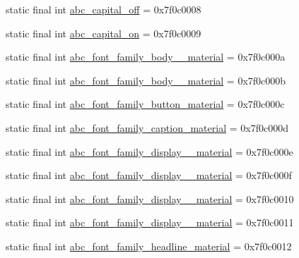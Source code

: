\begin{DoxyCompactItemize}
\item 
static final int \mbox{\hyperlink{classandroid_1_1support_1_1v7_1_1appcompat_1_1R_1_1string_aacb655193c810fc524a35c78ded4dcd3}{abc\+\_\+capital\+\_\+off}} = 0x7f0c0008
\item 
static final int \mbox{\hyperlink{classandroid_1_1support_1_1v7_1_1appcompat_1_1R_1_1string_a714a9eb16e5ecc1746afa1935c5db85e}{abc\+\_\+capital\+\_\+on}} = 0x7f0c0009
\item 
static final int \mbox{\hyperlink{classandroid_1_1support_1_1v7_1_1appcompat_1_1R_1_1string_adaa0ecc02001e33c4337d727dfdf67c4}{abc\+\_\+font\+\_\+family\+\_\+body\+\_\+\_\+material}} = 0x7f0c000a
\item 
static final int \mbox{\hyperlink{classandroid_1_1support_1_1v7_1_1appcompat_1_1R_1_1string_a6127fc35768e2627c9ba2221605f791e}{abc\+\_\+font\+\_\+family\+\_\+body\+\_\+\_\+material}} = 0x7f0c000b
\item 
static final int \mbox{\hyperlink{classandroid_1_1support_1_1v7_1_1appcompat_1_1R_1_1string_a2429f6336734f4aada6e25c554c6664e}{abc\+\_\+font\+\_\+family\+\_\+button\+\_\+material}} = 0x7f0c000c
\item 
static final int \mbox{\hyperlink{classandroid_1_1support_1_1v7_1_1appcompat_1_1R_1_1string_a0f7d1696200dbc7ff9e5252fa543fbb3}{abc\+\_\+font\+\_\+family\+\_\+caption\+\_\+material}} = 0x7f0c000d
\item 
static final int \mbox{\hyperlink{classandroid_1_1support_1_1v7_1_1appcompat_1_1R_1_1string_a177aacdc666532983bbc01a7f8586670}{abc\+\_\+font\+\_\+family\+\_\+display\+\_\+\_\+material}} = 0x7f0c000e
\item 
static final int \mbox{\hyperlink{classandroid_1_1support_1_1v7_1_1appcompat_1_1R_1_1string_af31d18a3d6df8714aa28bd3b9c4655b5}{abc\+\_\+font\+\_\+family\+\_\+display\+\_\+\_\+material}} = 0x7f0c000f
\item 
static final int \mbox{\hyperlink{classandroid_1_1support_1_1v7_1_1appcompat_1_1R_1_1string_a9d03424325dfb40b87aecd3dcde35abf}{abc\+\_\+font\+\_\+family\+\_\+display\+\_\+\_\+material}} = 0x7f0c0010
\item 
static final int \mbox{\hyperlink{classandroid_1_1support_1_1v7_1_1appcompat_1_1R_1_1string_a95a8f995e232d77e93de59a700e2bb07}{abc\+\_\+font\+\_\+family\+\_\+display\+\_\+\_\+material}} = 0x7f0c0011
\item 
static final int \mbox{\hyperlink{classandroid_1_1support_1_1v7_1_1appcompat_1_1R_1_1string_a1647ce9c5c7fb0407af0882f008a57aa}{abc\+\_\+font\+\_\+family\+\_\+headline\+\_\+material}} = 0x7f0c0012

\end{DoxyCompactItemize}
